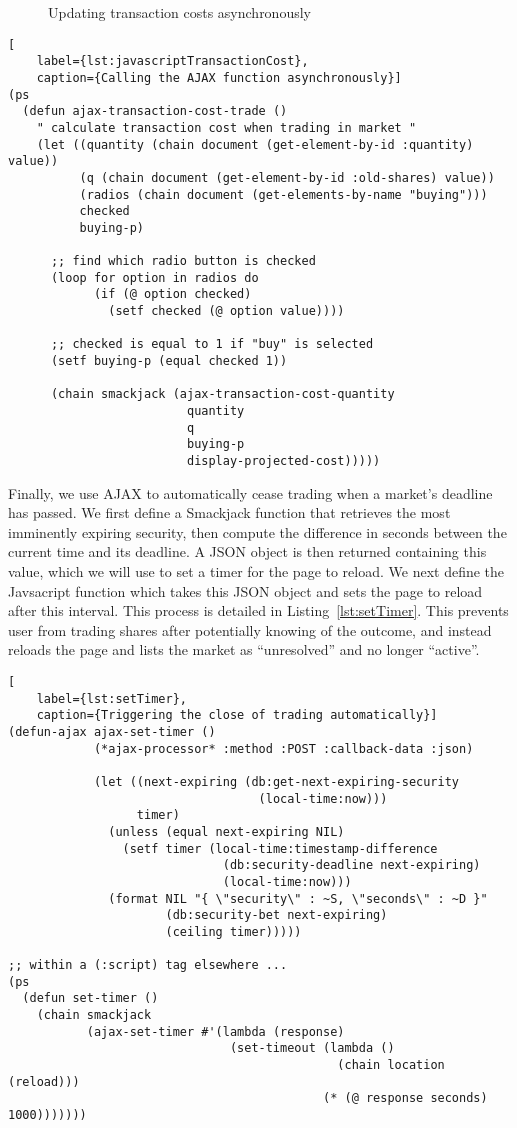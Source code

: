 \begin{figure}[htp]

	\caption{Updating transaction costs asynchronously}
\end{figure}

\begin{lstlisting}[
	label={lst:javascriptTransactionCost},
	caption={Calling the AJAX function asynchronously}]
(ps
  (defun ajax-transaction-cost-trade ()
	" calculate transaction cost when trading in market "
	(let ((quantity (chain document (get-element-by-id :quantity) value))
		  (q (chain document (get-element-by-id :old-shares) value))
		  (radios (chain document (get-elements-by-name "buying")))
		  checked
		  buying-p)

	  ;; find which radio button is checked
	  (loop for option in radios do
			(if (@ option checked)
			  (setf checked (@ option value))))

	  ;; checked is equal to 1 if "buy" is selected
	  (setf buying-p (equal checked 1))

	  (chain smackjack (ajax-transaction-cost-quantity
						 quantity
						 q
						 buying-p
						 display-projected-cost)))))
\end{lstlisting}

Finally, we use AJAX to automatically cease trading when a market's deadline
has passed. We first define a Smackjack function that retrieves the most
imminently expiring security, then compute the difference in seconds between
the current time and its deadline. A JSON object is then returned containing
this value, which we will use to set a timer for the page to reload. We next
define the Javsacript function  which takes this JSON object
and sets the page to reload after this interval. This process is detailed in
Listing~\ref{lst:setTimer}. This prevents user from trading shares after
potentially knowing of the outcome, and instead reloads the page and lists the
market as ``unresolved'' and no longer ``active''.

\begin{lstlisting}[
	label={lst:setTimer},
	caption={Triggering the close of trading automatically}]
(defun-ajax ajax-set-timer ()
			(*ajax-processor* :method :POST :callback-data :json)

			(let ((next-expiring (db:get-next-expiring-security
								   (local-time:now)))
				  timer)
			  (unless (equal next-expiring NIL)
				(setf timer (local-time:timestamp-difference
							  (db:security-deadline next-expiring)
							  (local-time:now)))
			  (format NIL "{ \"security\" : ~S, \"seconds\" : ~D }"
					  (db:security-bet next-expiring)
					  (ceiling timer)))))

;; within a (:script) tag elsewhere ...
(ps
  (defun set-timer ()
	(chain smackjack
		   (ajax-set-timer #'(lambda (response)
							   (set-timeout (lambda ()
											  (chain location (reload)))
									 		(* (@ response seconds) 1000)))))))
\end{lstlisting}
